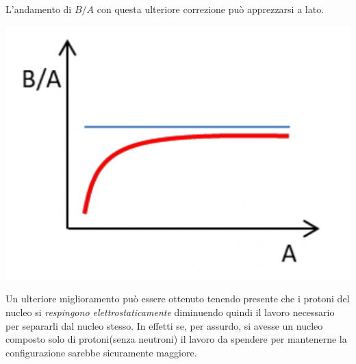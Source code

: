 L'andamento di \(B / A\) con questa ulteriore correzione
può apprezzarsi a lato.
\begin{marginfigure}
    \includegraphics{figs/goccia2}
    \label{fig:goccia2}
\end{marginfigure}

Un ulteriore miglioramento può essere ottenuto tenendo presente che i
protoni del nucleo si \emph{respingono elettrostaticamente} diminuendo
quindi il lavoro necessario per separarli dal nucleo stesso.
In effetti
se, per assurdo, si avesse un nucleo composto solo di protoni(senza
neutroni) il lavoro da spendere per mantenerne la configurazione sarebbe
sicuramente maggiore.

